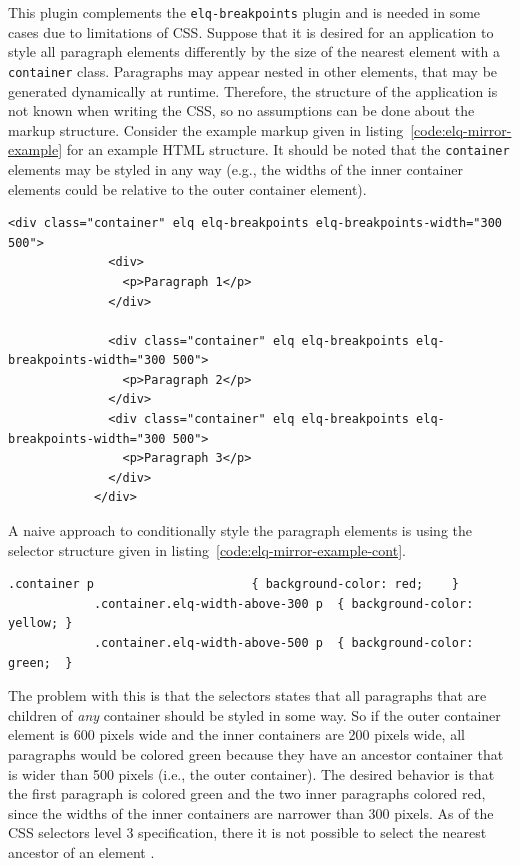 \documentclass[a4paper,11pt]{kth-mag}
\newcommand{\code}[1]{\texttt{#1}}
\begin{document}
          This plugin complements the \code{elq-breakpoints} plugin and is needed in some cases due to limitations of CSS.
          Suppose that it is desired for an application to style all paragraph elements differently by the size of the nearest element with a \code{container} class.
          Paragraphs may appear nested in other elements, that may be generated dynamically at runtime.
          Therefore, the structure of the application is not known when writing the \gls{CSS}, so no assumptions can be done about the markup structure.
          Consider the example markup given in listing~\ref{code:elq-mirror-example} for an example \gls{HTML} structure.
          It should be noted that the \code{container} elements may be styled in any way (e.g., the widths of the inner container elements could be relative to the outer container element).
          \begin{lstlisting}[gobble=12,caption={Example \gls{HTML} structure where all paragraphs are desired to be conditionally styled by the nearest ancestor container.},captionpos=b,label={code:elq-mirror-example}]
            <div class="container" elq elq-breakpoints elq-breakpoints-width="300 500">
              <div>
                <p>Paragraph 1</p>
              </div>

              <div class="container" elq elq-breakpoints elq-breakpoints-width="300 500">
                <p>Paragraph 2</p>
              </div>
              <div class="container" elq elq-breakpoints elq-breakpoints-width="300 500">
                <p>Paragraph 3</p>
              </div>
            </div>
          \end{lstlisting}
          A naive approach to conditionally style the paragraph elements is using the selector structure given in listing~\ref{code:elq-mirror-example-cont}.
          \begin{lstlisting}[gobble=12,caption={A naive approach to conditionally style the paragraph elements by the size of the nearest ancestor container element.},captionpos=b,label={code:elq-mirror-example-cont}]
            .container p                      { background-color: red;    }
            .container.elq-width-above-300 p  { background-color: yellow; }
            .container.elq-width-above-500 p  { background-color: green;  }
          \end{lstlisting}
          The problem with this is that the selectors states that all paragraphs that are children of \emph{any} container should be styled in some way.
          So if the outer container element is 600 pixels wide and the inner containers are 200 pixels wide, all paragraphs would be colored green because they have an ancestor container that is wider than 500 pixels (i.e., the outer container).
          The desired behavior is that the first paragraph is colored green and the two inner paragraphs colored red, since the widths of the inner containers are narrower than 300 pixels.
          As of the \gls{CSS} selectors level 3 specification, there it is not possible to select the nearest ancestor of an element \cite{w3c_css_selectors}.
          
\end{document}
